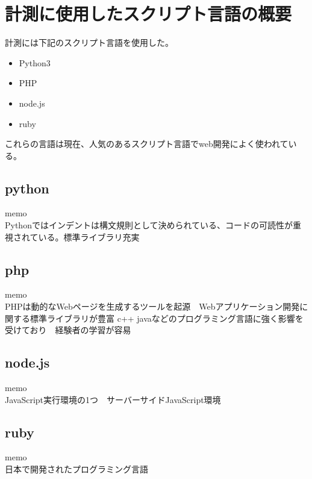\chapter{計測に使用したスクリプト言語の概要}
\label{cha:script-language}
計測には下記のスクリプト言語を使用した。
\begin{itemize}
  \item Python3
  \item PHP
　\item node.js
  \item ruby
\end{itemize}
これらの言語は現在、人気のあるスクリプト言語でweb開発によく使われている。

\section{python}
memo\\
Pythonではインデントは構文規則として決められている、コードの可読性が重視されている。標準ライブラリ充実
\section{php}
memo\\
PHPは動的なWebページを生成するツールを起源　Webアプリケーション開発に関する標準ライブラリが豊富
c++ javaなどのプログラミング言語に強く影響を受けており　経験者の学習が容易
\section{node.js}
memo\\
JavaScript実行環境の1つ　サーバーサイドJavaScript環境
\section{ruby}
memo\\
日本で開発されたプログラミング言語